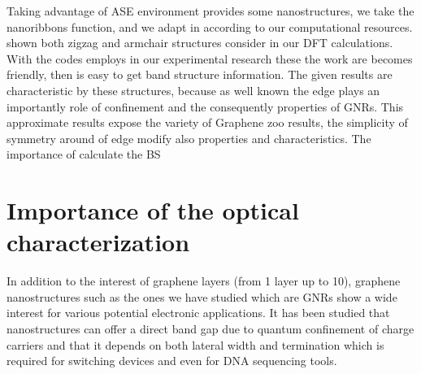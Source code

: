 
 Taking advantage of ASE environment provides some nanostructures, we take the nanoribbons function, and we adapt in according to our computational resources.  shown both zigzag and armchair structures consider in our DFT calculations. With the codes employs in our experimental research these the work are becomes friendly, then is easy to get band structure information. The given results are characteristic by these structures, because as well known the edge plays an importantly role of confinement and the consequently properties of GNRs. This approximate results expose the variety of Graphene zoo results, the simplicity of symmetry around of edge modify also properties and characteristics. The importance of calculate the \gls{BS} 




\section{Importance of the optical characterization}
\vspace{-1cm}
In addition to the interest of graphene layers (from 1 layer up to 10), graphene nanostructures such as the ones we have studied which are GNRs show a wide interest for various potential electronic applications. It has been studied that nanostructures can offer a direct band gap due to quantum confinement of charge carriers and that it depends on both lateral width and termination which is required for switching devices and even for DNA sequencing tools. 